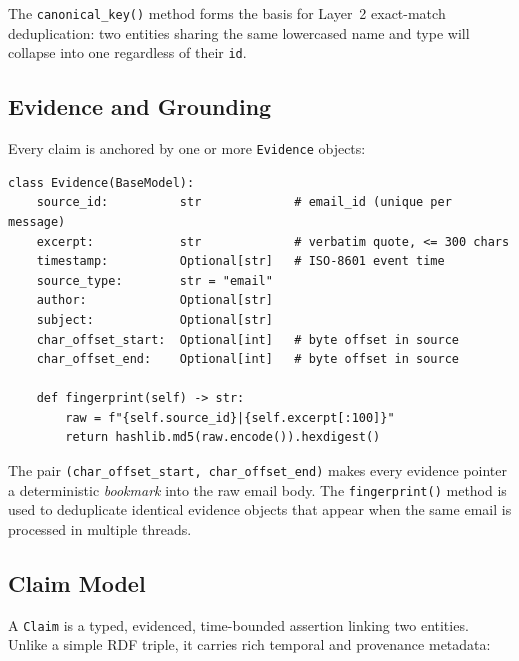 \documentclass[12pt,a4paper]{article}
\begin{document}
The \texttt{canonical\_key()} method forms the basis for Layer~2 exact-match deduplication: two entities sharing the same lowercased name and type will collapse into one regardless of their \texttt{id}.

\subsection{Evidence and Grounding}

Every claim is anchored by one or more \texttt{Evidence} objects:

\begin{lstlisting}[caption=Evidence model (schema.py)]
class Evidence(BaseModel):
    source_id:          str             # email_id (unique per message)
    excerpt:            str             # verbatim quote, <= 300 chars
    timestamp:          Optional[str]   # ISO-8601 event time
    source_type:        str = "email"
    author:             Optional[str]
    subject:            Optional[str]
    char_offset_start:  Optional[int]   # byte offset in source
    char_offset_end:    Optional[int]   # byte offset in source

    def fingerprint(self) -> str:
        raw = f"{self.source_id}|{self.excerpt[:100]}"
        return hashlib.md5(raw.encode()).hexdigest()
\end{lstlisting}

The pair \texttt{(char\_offset\_start, char\_offset\_end)} makes every evidence pointer a deterministic \textit{bookmark} into the raw email body. The \texttt{fingerprint()} method is used to deduplicate identical evidence objects that appear when the same email is processed in multiple threads.

\subsection{Claim Model}

A \texttt{Claim} is a typed, evidenced, time-bounded assertion linking two entities. Unlike a simple RDF triple, it carries rich temporal and provenance metadata:
\end{document}
